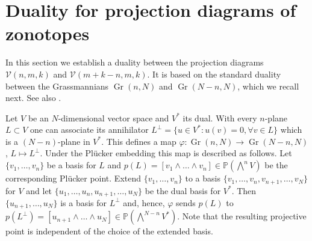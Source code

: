 \documentclass[11pt]{amsart}
\newcommand{\R}{\mathbb R}
\newcommand{\cV}{\mathcal V}
\newcommand{\Pro}{\mathbb P}
\def\vol{{\rm vol}}
\theoremstyle{definition}
\theoremstyle{remark}
\newcommand{\Gr}{\operatorname{Gr}}
\newcommand{\Note}[2]
{
	\todo[inline,color={#1}]
	{#2}
}
\newcommand{\Katja}[1]{\Note{kcolor}{K: #1}}
\begin{document}



\section{Duality for projection diagrams of zonotopes}\label{sec:duality}



In this section we establish a duality between the projection diagrams $\cV(n,m,k)$ and $\cV(m+k-n,m,k)$. It is based on the standard duality between the Grassmannians $\Gr(n,N)$ and $\Gr(N-n,N)$, which we recall next. See also \cite[Lecture 6]{Ha}.

Let $V$ be an $N$-dimensional vector space and $V^*$ its dual. With every $n$-plane $L\subset V$ one can associate its annihilator 
$L^\perp=\{u\in V^* : u(v)=0, \forall v\in L\}$ which is a $(N-n)$-plane in $V^*$. This defines a map $\varphi:\Gr(n,N)\longrightarrow\Gr(N-n,N)$, $L\mapsto L^\perp$. 
Under the Plücker embedding this map is described as follows. Let $\{v_1,\dots, v_n\}$ be a basis for $L$
 and $p(L)=[v_1\wedge\dots\wedge v_n]\in\Pro(\bigwedge^n V)$ be the corresponding Plücker point. Extend $\{v_1,\dots, v_n\}$ to a basis $\{v_1,\dots, v_n,v_{n+1},\dots, v_N\}$ for $V$ and let $\{u_1,\dots, u_n,u_{n+1},\dots, u_N\}$ be the dual basis for $V^*$. Then
 $\{u_{n+1},\dots,u_N\}$ is a basis for $L^\perp$ and, hence,
 $\varphi$ sends $p(L)$ to $p(L^\perp)=[u_{n+1}\wedge\dots\wedge u_N]\in \Pro(\bigwedge^{N-n} V^*)$. Note that the resulting projective point is independent of the choice of the extended basis.
\end{document}
